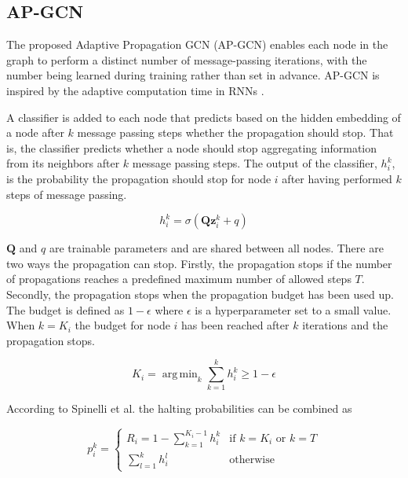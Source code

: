 \documentclass{gdl}
\DeclareMathOperator*{\argmin}{arg\,min}
\begin{document}
\subsection{AP-GCN}
The proposed Adaptive Propagation GCN (AP-GCN) enables each node in the graph to perform a distinct number of message-passing iterations, with the number being learned during training rather than set in advance. AP-GCN is inspired by the adaptive computation time in RNNs \cite{graves2017}.

A classifier is added to each node that predicts based on the hidden embedding of a node after $k$ message passing steps whether the propagation should stop. That is, the classifier predicts whether a node should stop aggregating information from its neighbors after $k$ message passing steps. The output of the classifier, $h^k_i$, is the probability the propagation should stop for node $i$ after having performed $k$ steps of message passing.

\begin{equation}
h^k_i = \sigma(\textbf{Q}\textbf{z}^k_i + q)
\end{equation}

\noindent $\textbf{Q}$ and $q$ are trainable parameters and are shared between all nodes. There are two ways the propagation can stop. Firstly, the propagation stops if the number of propagations reaches a predefined maximum number of allowed steps $T$. Secondly, the propagation stops when the propagation budget has been used up. The budget is defined as $1-\epsilon$ where $\epsilon$ is a hyperparameter set to a small value. When $k=K_i$ the budget for node $i$ has been reached after $k$ iterations and the propagation stops. 

\begin{equation}
    K_i = \argmin_{k} \sum_{k=1}^{k} h_i^k \geq 1-\epsilon
\end{equation}

\noindent According to Spinelli et al. the halting probabilities can be combined as

\begin{equation}
    p_i^k = 
    \begin{cases}
    R_i = 1 - \sum_{k=1}^{K_i - 1} h_i^k & \text{if } k = K_i \text{ or } k = T \\
    \sum_{l=1}^{k} h_i^l & \text{otherwise}
    \end{cases}
    \label{eq:p}
\end{equation}
\end{document}

